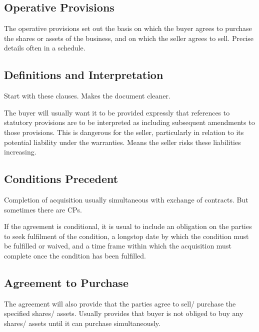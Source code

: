 \documentclass[
]{article}
\begin{document}
\hypertarget{operative-provisions}{%
\subsection{Operative Provisions}\label{operative-provisions}}

The operative provisions set out the basis on which the buyer agrees to
purchase the shares or assets of the business, and on which the seller
agrees to sell. Precise details often in a schedule.

\hypertarget{definitions-and-interpretation}{%
\subsection{Definitions and
Interpretation}\label{definitions-and-interpretation}}

Start with these clauses. Makes the document cleaner.

The buyer will usually want it to be provided expressly that references
to statutory provisions are to be interpreted as including subsequent
amendments to those provisions. This is dangerous for the seller,
particularly in relation to its potential liability under the
warranties. Means the seller risks these liabilities increasing.

\hypertarget{conditions-precedent}{%
\subsection{Conditions Precedent}\label{conditions-precedent}}

Completion of acquisition usually simultaneous with exchange of
contracts. But sometimes there are CPs.

If the agreement is conditional, it is usual to include an obligation on
the parties to seek fulfilment of the condition, a longstop date by
which the condition must be fulfilled or waived, and a time frame within
which the acquisition must complete once the condition has been
fulfilled.

\hypertarget{agreement-to-purchase}{%
\subsection{Agreement to Purchase}\label{agreement-to-purchase}}

The agreement will also provide that the parties agree to sell/ purchase
the specified shares/ assets. Usually provides that buyer is not obliged
to buy any shares/ assets until it can purchase simultaneously.
\end{document}
